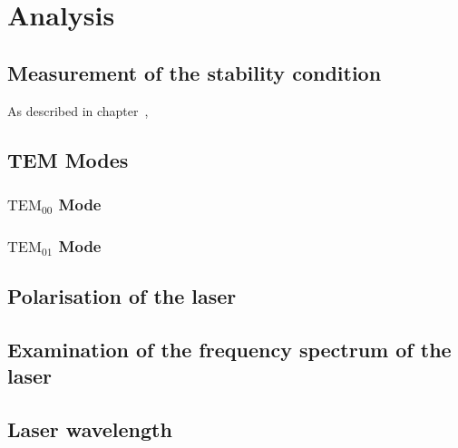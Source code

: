 \section{Analysis}
\subsection{Measurement of the stability condition}
As described in chapter~\cite{sec:},

\subsection{TEM Modes}
\subsubsection{\texorpdfstring{$\text{TEM}_{00}$}{TEM} Mode}
\subsubsection{\texorpdfstring{$\text{TEM}_{01}$}{TEM} Mode}
\subsection{Polarisation of the laser}
\subsection{Examination of the frequency spectrum of the laser}
\subsection{Laser wavelength}
